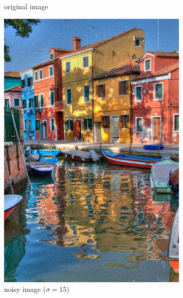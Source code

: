 \documentclass[a4paper, twocolumn, twoside]{article}
\begin{document}
\begin{figure}[h!]
\begin{subfigure}{.32\textwidth}
        \caption{original image}
    \end{subfigure}
    \hfill
    \begin{subfigure}{.32\textwidth}
        \centering
        \includegraphics[width=\linewidth]{images/noisy.png}
        \caption{noisy image ($\sigma = 15$)}
    \end{subfigure}
    \hfill
    \begin{subfigure}{.32\textwidth}
        \centering

\end{subfigure}
\end{figure}
\end{document}
